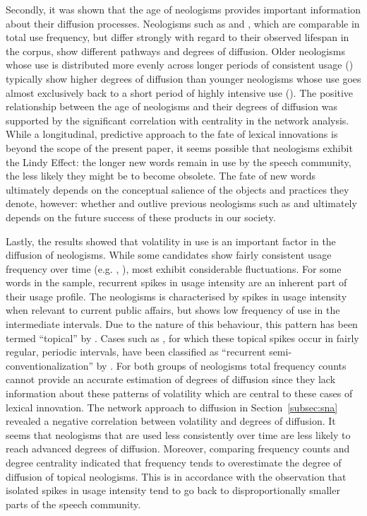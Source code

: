 \documentclass[
  a4paper,
  abstract=on,
  captions=tableabove
  ]{scrartcl}
\begin{document}
    Secondly, it was shown that the age of neologisms provides important information about their diffusion processes. Neologisms such as  and , which are comparable in total use frequency, but differ strongly with regard to their observed lifespan in the corpus, show different pathways and degrees of diffusion. Older neologisms whose use is distributed more evenly across longer periods of consistent usage () typically show higher degrees of diffusion than younger neologisms whose use goes almost exclusively back to a short period of highly intensive use (). The positive relationship between the age of neologisms and their degrees of diffusion was supported by the significant correlation with centrality in the network analysis. While a longitudinal, predictive approach to the fate of lexical innovations is beyond the scope of the present paper, it seems possible that neologisms exhibit the Lindy Effect: the longer new words remain in use by the speech community, the less likely they might be to become obsolete. The fate of new words ultimately depends on the conceptual salience of the objects and practices they denote, however: whether  and  outlive previous neologisms such as  and  ultimately depends on the future success of these products in our society.

    Lastly, the results showed that volatility in use is an important factor in the diffusion of neologisms. While some candidates show fairly consistent usage frequency over time (e.g. , ), most exhibit considerable fluctuations. For some words in the sample, recurrent spikes in usage intensity are an inherent part of their usage profile. The neologisms  is characterised by spikes in usage intensity when relevant to current public affairs, but shows low frequency of use in the intermediate intervals. Due to the nature of this behaviour, this pattern has been termed \enquote{topical} by \cite{Fischer1998LexicalChange}. Cases such as , for which these topical spikes occur in fairly regular, periodic intervals, have been classified as \enquote{recurrent semi-conventionalization} by \cite{Kerremans2015WebNew}. For both groups of neologisms total frequency counts cannot provide an accurate estimation of degrees of diffusion since they lack information about these patterns of volatility which are central to these cases of lexical innovation. The network approach to diffusion in Section~\ref{subsec:sna} revealed a negative correlation between volatility and degrees of diffusion. It seems that neologisms that are used less consistently over time are less likely to reach advanced degrees of diffusion. Moreover, comparing frequency counts and degree centrality indicated that frequency tends to overestimate the degree of diffusion of topical neologisms. This is in accordance with the observation that isolated spikes in usage intensity tend to go back to disproportionally smaller parts of the speech community.
\end{document}
